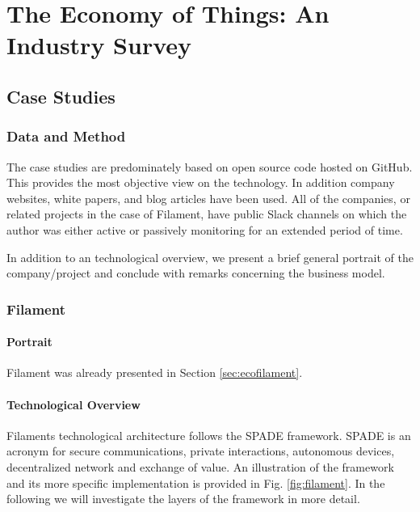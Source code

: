 \chapter{The Economy of Things: An Industry Survey}
\label{sec:economy}



\section{Case Studies}

\subsection{Data and Method}

The case studies are predominately based on open source code hosted on GitHub. This provides the most objective view on the technology. In addition company websites, white papers, and blog articles have been used. All of the companies, or related projects in the case of Filament, have public Slack channels on which the author was either active or passively monitoring for an extended period of time.

In addition to an technological overview, we present a brief general portrait of the company/project and conclude with remarks concerning the business model. 

\subsection{Filament}

\subsubsection{Portrait}

Filament was already presented in Section \ref{sec:ecofilament}. 

\subsubsection{Technological Overview}

Filaments technological architecture follows the SPADE framework. SPADE is an acronym for secure communications, private interactions, autonomous devices, decentralized network and exchange of value. An illustration of the framework and its more specific implementation is provided in Fig. \ref{fig:filament}. In the following we will investigate the layers of the framework in more detail. 

